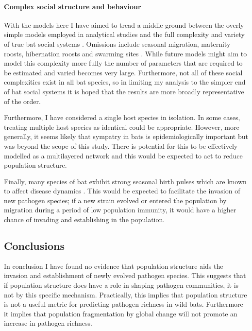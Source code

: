 \paragraph{Complex social structure and behaviour}

With the models here I have aimed to tread a middle ground between the overly simple models employed in analytical studies \cite{allen2004sis} and the full complexity and variety of true bat social systems \cite{kerth2008causes}.
Omissions include seasonal migration,  maternity roosts, hibernation roosts and swarming sites \cite{kerth2008causes, fleming2003ecology, richter2008first, cryan2014continental}. 
While future models might aim to model this complexity more fully the number of parameters that are required to be estimated and varied becomes very large.
Furthermore, not all of these social complexities exist in all bat species, so in limiting my analysis to the simpler end of bat social systems it is hoped that the results are more broadly representative of the order.

Furthermore, I have considered a single host species in isolation.
In some cases, treating multiple host species as identical could be appropriate.
However, more generally, it seems likely that sympatry in bats is epidemiologically important \cite{brierley2016quantifying, luis2013comparison} but was beyond the scope of this study.
There is potential for this to be effectively modelled as a multilayered network \cite{wang2016structural, funk2010interacting} and this would be expected to act to reduce population structure.

Finally, many species of bat exhibit strong seasonal birth pulses which are known to affect disease dynamics \cite{hayman2015biannual,peel2014effect,amman2012seasonal}.
This would be expected to facilitate the invasion of new pathogen species; if a new strain evolved or entered the population by migration during a period of low population immunity, it would have a higher chance of invading and establishing in the population.

\subsection{Conclusions}

In conclusion I have found no evidence that population structure aids the invasion and establishment of newly evolved pathogen species.
This suggests that if population structure does have a role in shaping pathogen communities, it is not by this specific mechanism.
Practically, this implies that population structure is not a useful metric for predicting pathogen richness in wild bats.
Furthermore it implies that population fragmentation by global change will not promote an increase in pathogen richness.





